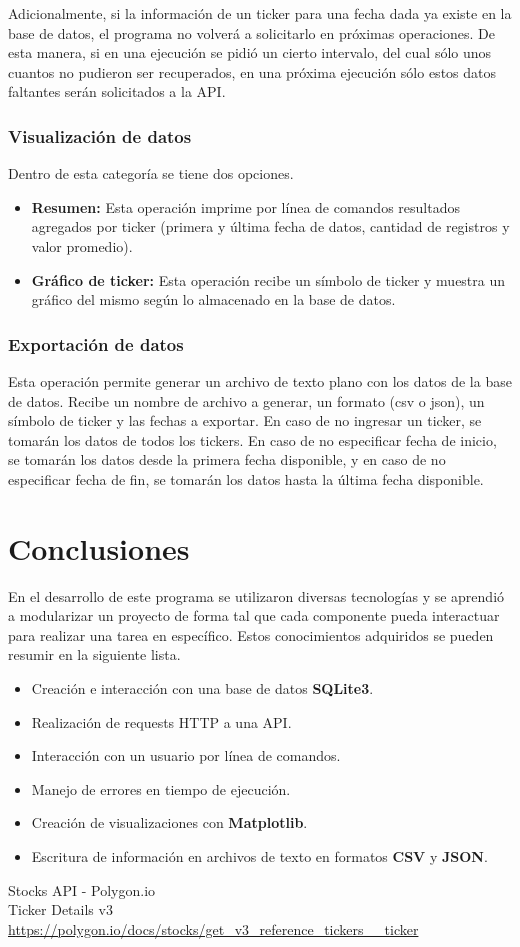 \documentclass{article}
\begin{document}
Adicionalmente, si la información de un ticker para una fecha dada ya existe en la base de datos,
el programa no volverá a solicitarlo en próximas operaciones. De esta manera, si en una ejecución
se pidió un cierto intervalo, del cual sólo unos cuantos no pudieron ser recuperados, en una próxima
ejecución sólo estos datos faltantes serán solicitados a la API.

\subsubsection{Visualización de datos}
Dentro de esta categoría se tiene dos opciones.
\begin{itemize}
    \item \textbf{Resumen:} Esta operación imprime por línea de comandos resultados agregados por
    ticker (primera y última fecha de datos, cantidad de registros y valor promedio).
    \item \textbf{Gráfico de ticker:} Esta operación recibe un símbolo de ticker y muestra un
    gráfico del mismo según lo almacenado en la base de datos.
\end{itemize}

\subsubsection{Exportación de datos}
Esta operación permite generar un archivo de texto plano con los datos de la base de datos.
Recibe un nombre de archivo a generar, un formato (csv o json), un símbolo de ticker
y las fechas a exportar. En caso de no ingresar un ticker, se tomarán los datos de todos los tickers.
En caso de no especificar fecha de inicio, se tomarán los datos desde
la primera fecha disponible, y en caso de no especificar fecha de fin, se tomarán los datos hasta
la última fecha disponible.

\section{Conclusiones}
En el desarrollo de este programa se utilizaron diversas tecnologías y se aprendió a modularizar
un proyecto de forma tal que cada componente pueda interactuar para realizar una tarea en específico.
Estos conocimientos adquiridos se pueden resumir en la siguiente lista.
\begin{itemize}
    \item Creación e interacción con una base de datos \textbf{SQLite3}.
    \item Realización de requests HTTP a una API.
    \item Interacción con un usuario por línea de comandos.
    \item Manejo de errores en tiempo de ejecución.
    \item Creación de visualizaciones con \textbf{Matplotlib}.
    \item Escritura de información en archivos de texto en formatos \textbf{CSV} y \textbf{JSON}.
\end{itemize}

\begin{thebibliography}{9} 
		Stocks API - Polygon.io\\
		Ticker Details v3\\
		\url{https://polygon.io/docs/stocks/get_v3_reference_tickers__ticker}
	 
\end{thebibliography}
\end{document}
